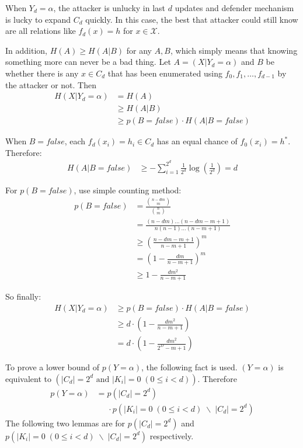 \documentclass[10pt, conference, compsocconf]{IEEEtran}
\begin{document}
		\begin{IEEEproof}
			When $Y_d = \alpha$, the attacker
			is unlucky in last $d$ updates
			and defender mechanism is lucky
			to expand $C_d$ quickly.
			In this case, the best that attacker
			could still know are all relations
			like $f_d(x) = h$ for $x \in \mathcal X$.
			
			In addition, $H(A) \geq H(A|B)$ for
			any $A, B$, which simply means that knowing something
			more can never be a bad thing. Let $A = (X | Y_d = \alpha)$
			and $B$ be whether there is any $x \in C_d$ that
			has been enumerated using $f_0, f_1, \ldots, f_{d-1}$ 
			by the attacker or not.
			Then
			\begin{align*}
				H(X | Y_d = \alpha) &= H(A)\\
					&\geq H(A | B)\\
					&\geq p(B = false) \cdot H(A | B = false)
			\end{align*}
			
			When $B = false$, each $f_d(x_i) = h_i \in C_d$
			has an equal chance of $f_0(x_i) = h^*$. Therefore:
			\begin{align*}
				H(A | B = false) &\geq -\sum_{i = 1}^{2^d} \frac{1}{2^d} \log(\frac{1}{2^d})
					= d
			\end{align*}
			
			For $p(B = false)$, use simple counting method:
			\begin{align*}
				p(B = false) &= \frac{\binom{n-dm}{m}}{\binom{n}{m}}\\
					&= \frac{(n-dm)\ldots(n-dm-m+1)}{n(n-1)\ldots(n-m+1)}\\
					&\geq (\frac{n-dm-m+1}{n-m+1})^m\\
					&= (1-\frac{dm}{n-m+1})^m\\
					&\geq 1-\frac{dm^2}{n-m+1}
			\end{align*}
			
			So finally:
			\begin{align*}
				H(X | Y_d = \alpha) &\geq p(B = false) \cdot H(A | B = false)\\
					&\geq d \cdot (1-\frac{dm^2}{n-m+1})\\
					&= d \cdot (1-\frac{dm^2}{2^D-m+1})
			\end{align*}
		\end{IEEEproof}
		
		To prove a lower bound of $p(Y = \alpha)$, the following fact is used.
		$(Y = \alpha)$ is equivalent to $\left(|C_d| = 2^d \text{ and } |K_i| = 0	\; (0 \leq i < d)\right)$.
		Therefore 
		\begin{align*}
			p(Y = \alpha) &= p(|C_d| = 2^d)\\
				& \;\;\;\;\; \cdot p(|K_i| = 0	\; (0 \leq i < d) \; \backslash \; |C_d| = 2^d)
		\end{align*}
		The following two lemmas are for $p(|C_d| = 2^d)$ and $p(|K_i| = 0	\; (0 \leq i < d) \; \backslash \; |C_d| = 2^d)$ 
		respectively.
		
\end{document}
